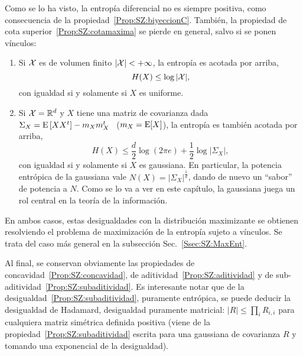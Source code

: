 Como se  lo ha  visto, la  entrop\'ia diferencial no  es siempre  positiva, como
consecuencia de la  propiedad~\ref{Prop:SZ:biyeccionC}.  Tambi\'en, la propiedad
de  cota superior~\ref{Prop:SZ:cotamaxima}  se pierde  en general,  salvo  si se
ponen v\'inculos:
%
\begin{propiedadesC}\setcounter{enumi}{\value{PropCotamaxima}}
\item
  \begin{enumerate}
  \item\label{Prop:SZ:cotamaximauniforme} Si $\mathcal{X}$ es de volumen finito $|\mathcal{X}| < +
    \infty$, la entrop\'ia es acotada por arriba,
    \[
    H(X) \le \log |\mathcal{X}|,
    \]
    con igualdad si y solamente si $X$ es uniforme.
  \item\label{Prop:SZ:cotamaximagaussiana}  Si  $\mathcal{X} =\mathbb{R}^d$  y  $X$ tiene  una
    matriz  de covarianza  dada \  $\Sigma_X =  \operatorname{E}\left[ X  X^t \right]  - m_X
    m_X^t$ \ ($m_X = \operatorname{E}[X]$), la entrop\'ia es tambi\'en acotada por arriba,
    \[
    H(X) \le \frac{d}{2} \log(2 \pi e) + \frac12 \log |\Sigma_X|,
    \]
    con igualdad si y solamente si $X$ es gaussiana.  En particular, la potencia
    entr\'opica de la gaussiana vale $N(X) = \left| \Sigma_X \right|^{\frac1d}$,
    dando de nuevo un ``sabor'' de potencia a  $N$.  Como se lo va a ver en este
    cap\'itulo,  la  gaussiana  juega  un  rol  central en  la  teor\'ia  de  la
    informaci\'on.
  \end{enumerate}
  En  ambos casos,  estas  desigualdades con  la  distribuci\'on maximizante  se
  obtienen resolviendo el  problema de maximizaci\'on de la  entrop\'ia sujeto a
  v\'inculos.    Se  trata   del   caso  m\'as   general   en  la   subsecci\'on
  Sec.~\ref{Ssec:SZ:MaxEnt}.
\end{propiedadesC}

Al     final,     se     conservan     obviamente     las     propiedades     de
concavidad~\ref{Prop:SZ:concavidad}, de aditividad~\ref{Prop:SZ:aditividad} y de
sub-aditividad~\ref{Prop:SZ:subaditividad}.   Es  interesante  notar que  de  la
desigualdad~\ref{Prop:SZ:subaditividad}, puramente entr\'opica, se puede deducir
la desigualdad  de Hadamard, desigualdad  puramente matricial: $|R|  \le \prod_i
R_{i,i}$  para cualquiera  matriz  sim\'etrica definida  positiva  (viene de  la
propiedad~\ref{Prop:SZ:subaditividad} escrita  para una gaussiana  de covarianza
$R$ y tomando una exponencial de la desigualdad).

\

